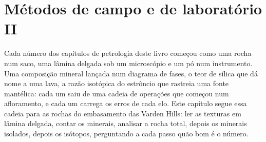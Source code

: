 \chapter{Métodos de campo e de laboratório II}\label{ch:b2:field-lab-methods-2}

Cada número dos capítulos de petrologia deste livro começou como uma rocha num saco, uma lâmina delgada sob um
microscópio e um pó num instrumento. Uma composição mineral lançada num diagrama de fases, o
teor de sílica que dá nome a uma lava, a razão isotópica do estrôncio que rastreia uma fonte mantélica: cada um
saiu de uma cadeia de operações que começou num afloramento, e cada um carrega os erros de cada
elo. Este capítulo segue essa cadeia para as rochas do embasamento das Varden Hills: ler as texturas
em lâmina delgada, contar os minerais, analisar a rocha total, depois os minerais isolados, depois os isótopos,
perguntando a cada passo quão bom é o número.

